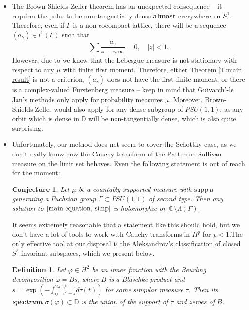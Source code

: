 \documentclass[11pt]{article}
\newtheorem{definition}{Definition}[section]
\newtheorem{conjecture}{Conjecture}[section]
\begin{document}
\begin{itemize}
	The Douglas-Shields-Shapiro theorem implies that any holomorphic function with the radius of convergence exceeding $1$ is either cyclic with respect to the backward shift or rational. It is reasonable to assume that \eqref{main equation, simp} only has rational solutions when $\mu$ is supported on a single element, and we conjecture that former never happens.
	\item The Brown-Shields-Zeller theorem has an unexpected consequence -- it requires the poles to be non-tangentially dense \textbf{almost} everywhere on $S^1$. Therefore, even if $\Gamma$ is a non-cocompact lattice, there will be a sequence $(a_\gamma) \in l^1(\Gamma)$ such that
	\[
	\sum \frac{a_\gamma}{z - \gamma.\infty} = 0, \quad |z| < 1.
	\]
	However, due to \cite{guivarch1990} we know that the Lebesgue measure is not stationary with respect to any $\mu$ with finite first moment. Therefore, either Theorem \ref{T:main result} is not a criterion, $(a_\gamma)$ does not have the first finite moment, or there is a complex-valued Furstenberg measure -- keep in mind that Guivarch'-le Jan's methods only apply for probability measures $\mu$. Moreover, Brown-Shields-Zeller would also apply for any dense subgroup of $PSU(1,1)$, as any orbit which is dense in $\mathbb{D}$ will be non-tangentially dense, which is also quite surprising. 
	\item Unfortunately, our method does not seem to cover the Schottky case, as we don't really know how the Cauchy transform of the Patterson-Sullivan measure on the limit set behaves. Even the following statement is out of reach for the moment:
	\begin{conjecture}
		Let $\mu$ be a countably supported measure with $\text{supp} \, \mu$ generating a Fuchsian group $\Gamma \subset PSU(1,1)$ of second type. Then any solution to $\ref{main equation, simp}$ is holomorphic on $\overline{\mathbb{C}} \setminus \Lambda(\Gamma)$. 
	\end{conjecture}
	It seems extremely reasonable that a statement like this should hold, but we don't have a lot of tools to work with Cauchy transforms in $H^p$ for $p < 1$.The only effective tool at our disposal is the Aleksandrov's classification of closed $S^*$-invariant subspaces, which we present below.
	
	\begin{definition}
		Let $\varphi \in H^2$ be an inner function with the Beurling decomposition $\varphi = Bs$, where $B$ is a Blaschke product and $s = \exp\left( -  \int_0^{2\pi} \frac{e^{it} + z}{e^{it} - z} d\tau(t) \right)$ for some singular measure $\tau$. Then its \textbf{spectrum} $\sigma(\varphi) \subset \overline{\mathbb{D}}$ is the union of the support of $\tau$ and zeroes of $B$. 
	\end{definition}
	

\end{itemize}
\end{document}
